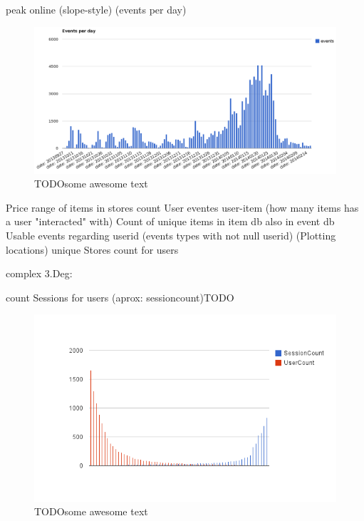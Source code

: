         peak online (slope-style) (events per day)

\begin{figure}[H]
    \includegraphics[width=5in]{image/events_per_day.png}
    \centering
    \caption[Distribution of events per day]{TODOsome awesome text}
    \label{figure:ratingdistr}
\end{figure}


        Price range of items in stores
        count User eventes
        user-item (how many items has a user "interacted" with)
        Count of unique items in item db also in event db
        Usable events regarding userid (events types with not null userid)
        (Plotting locations)
        unique Stores count for users

    complex 3.Deg:

        count Sessions for users (aprox: sessioncount)TODO

\begin{figure}[H]
    \includegraphics[width=5in]{image/global_sessioncount.png}
    \centering
    \caption[Count of sessions per user mapped with count of user with give
    session amount]{TODOsome awesome text}
    \label{figure:ratingdistr}
\end{figure}

